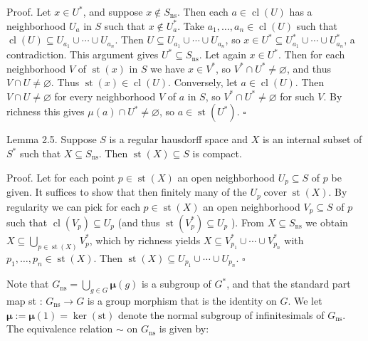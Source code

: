 \documentclass[10pt]{article}
\begin{document}
Proof. Let $x \in U^{*}$, and suppose $x \notin S_{\mathrm{ns}}$. Then each $a \in \operatorname{cl}(U)$ has a neighborhood $U_{a}$ in $S$ such that $x \notin U_{a}^{*}$. Take $a_{1}, \ldots, a_{n} \in \operatorname{cl}(U)$ such that $\operatorname{cl}(U) \subseteq U_{a_{1}} \cup \cdots \cup U_{a_{n}}$. Then $U \subseteq U_{a_{1}} \cup \cdots \cup U_{a_{n}}$, so $x \in U^{*} \subseteq U_{a_{1}}^{*} \cup \cdots \cup U_{a_{n}}^{*}$, a contradiction. This argument gives $U^{*} \subseteq S_{\mathrm{ns}}$. Let again $x \in U^{*}$. Then for each neighborhood $V$ of $\operatorname{st}(x)$ in $S$ we have $x \in V^{*}$, so $V^{*} \cap U^{*} \neq \varnothing$, and thus $V \cap U \neq \varnothing$. Thus $\operatorname{st}(x) \in \operatorname{cl}(U)$. Conversely, let $a \in \operatorname{cl}(U)$. Then $V \cap U \neq \varnothing$ for every neighborhood $V$ of $a$ in $S$, so $V^{*} \cap U^{*} \neq \varnothing$ for such $V$. By richness this gives $\mu(a) \cap U^{*} \neq \varnothing$, so $a \in \operatorname{st}\left(U^{*}\right)$. \(\square\)

Lemma 2.5. Suppose $S$ is a regular hausdorff space and $X$ is an internal subset of $S^{*}$ such that $X \subseteq S_{\mathrm{ns}}$. Then $\operatorname{st}(X) \subseteq S$ is compact.

Proof. Let for each point $p \in \operatorname{st}(X)$ an open neighborhood $U_{p} \subseteq S$ of $p$ be given. It suffices to show that then finitely many of the $U_{p} \operatorname{cover} \operatorname{st}(X)$. By regularity we can pick for each $p \in \operatorname{st}(X)$ an open neighborhood $V_{p} \subseteq S$ of $p$ such that $\operatorname{cl}\left(V_{p}\right) \subseteq U_{p}$ (and thus $\operatorname{st}\left(V_{p}^{*}\right) \subseteq U_{p}$ ). From $X \subseteq S_{\mathrm{ns}}$ we obtain $X \subseteq \bigcup_{p \in \operatorname{st}(X)} V_{p}^{*}$, which by richness yields $X \subseteq V_{p_{1}}^{*} \cup \cdots \cup V_{p_{n}}^{*}$ with $p_{1}, \ldots, p_{n} \in \operatorname{st}(X)$. Then $\operatorname{st}(X) \subseteq U_{p_{1}} \cup \cdots \cup U_{p_{n}}$. \(\square\)

Note that $G_{\mathrm{ns}}=\bigcup_{g \in G} \boldsymbol{\mu}(g)$ is a subgroup of $G^{*}$, and that the standard part map st : $G_{\mathrm{ns}} \rightarrow G$ is a group morphism that is the identity on $G$. We let $\boldsymbol{\mu}:=\boldsymbol{\mu}(1)=\operatorname{ker}(\mathrm{st})$ denote the normal subgroup of infinitesimals of $G_{\mathrm{ns}}$. The equivalence relation $\sim$ on $G_{\mathrm{ns}}$ is given by:
\end{document}
